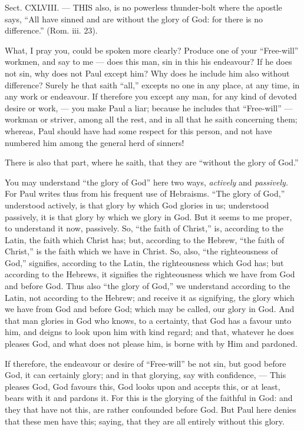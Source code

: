 
Sect. CXLVIII. — THIS also, is no powerless thunder-bolt where the apostle says, “All have sinned and are without the glory of God: for there is no difference.” (Rom. iii. 23).

What, I pray you, could be spoken more clearly? Produce one of your “Free-will” workmen, and say to me — does this man, sin in this his endeavour? If he does not sin, why does not Paul except him? Why does he include him also without difference? Surely he that saith “all,” excepts no one in any place, at any time, in any work or endeavour. If therefore you except any man, for any kind of devoted desire or work, — you make Paul a liar; because he includes that “Free-will” — workman or striver, among all the rest, and in all that he saith concerning them; whereas, Paul should have had some respect for this person, and not have numbered him among the general herd of sinners!

There is also that part, where he saith, that they are “without the glory of God.”

You may understand “the glory of God” here two ways, \emph{actively }and \emph{passively. }For Paul writes thus from his frequent use of Hebraisms. “The glory of God,” understood actively, is that glory by which God glories in us; understood passively, it is that glory by which we glory in God. But it seems to me proper, to understand it now, passively. So, “the faith of Christ,” is, according to the Latin, the faith which Christ has; but, according to the Hebrew, “the faith of Christ,” is the faith which we have in Christ. So, also, “the righteousness of God,” signifies, according to the Latin, the righteousness which God has; but according to the Hebrews, it signifies the righteousness which we have from God and before God. Thus also “the glory of God,” we understand according to the Latin, not according to the Hebrew; and receive it as signifying, the glory which we have from God and before God; which may be called, our glory in God. And that man glories in God who knows, to a certainty, that God has a favour unto him, and deigns to look upon him with kind regard; and that, whatever he does pleases God, and what does not please him, is borne with by Him and pardoned.

If therefore, the endeavour or desire of “Free-will” be not sin, but good before God, it can certainly glory; and in that glorying, say with confidence, — This pleases God, God favours this, God looks upon and accepts this, or at least, bears with it and pardons it. For this is the glorying of the faithful in God: and they that have not this, are rather confounded before God. But Paul here denies that these men have this; saying, that they are all entirely without this glory.


